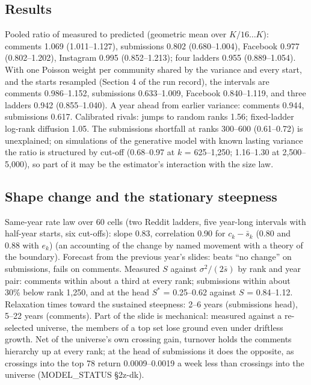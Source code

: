 \documentclass[10pt]{article}
\begin{document}
\subsection{Results}
Pooled ratio of measured to predicted (geometric mean over $K/16\ldots K$): comments 1.069 (1.011--1.127), submissions 0.802 (0.680--1.004), Facebook 0.977 (0.802--1.202), Instagram 0.995 (0.852--1.213); four ladders 0.955 (0.889--1.054). With one Poisson weight per community shared by the variance and every start, and the starts resampled (Section 4 of the run record), the intervals are comments 0.986--1.152, submissions 0.633--1.009, Facebook 0.840--1.119, and three ladders 0.942 (0.855--1.040). A year ahead from earlier variance: comments 0.944, submissions 0.617. Calibrated rivals: jumps to random ranks 1.56; fixed-ladder log-rank diffusion 1.05. The submissions shortfall at ranks 300--600 (0.61--0.72) is unexplained; on simulations of the generative model with known lasting variance the ratio is structured by cut-off (0.68--0.97 at $k$ = 625--1,250; 1.16--1.30 at 2,500--5,000), so part of it may be the estimator's interaction with the size law.
\subsection{Shape change and the stationary steepness}
Same-year rate law over 60 cells (two Reddit ladders, five year-long intervals with half-year starts, six cut-offs): slope 0.83, correlation 0.90 for $c_k - \bar s_k$ (0.80 and 0.88 with $e_k$) (an accounting of the change by named movement with a theory of the boundary). Forecast from the previous year's slides: beats ``no change'' on submissions, fails on comments. Measured $S$ against $\sigma^2/(2\bar s)$ by rank and year pair: comments within about a third at every rank; submissions within about 30\% below rank 1,250, and at the head $S^\ast$ = 0.25--0.62 against $S$ = 0.84--1.12. Relaxation times toward the sustained steepness: 2--6 years (submissions head), 5--22 years (comments). Part of the slide is mechanical: measured against a re-selected universe, the members of a top set lose ground even under driftless growth. Net of the universe's own crossing gain, turnover holds the comments hierarchy up at every rank; at the head of submissions it does the opposite, as crossings into the top 78 return 0.0009--0.0019 a week less than crossings into the universe (MODEL\_STATUS \S2z-dk).
\end{document}
